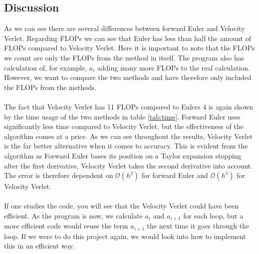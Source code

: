 \documentclass{article}
\begin{document}
\subsection{Discussion}
As we can see there are several differences between forward Euler and Velocity Verlet. Regarding FLOPs we can see that Euler has less than half the amount of FLOPs compared to Velocity Verlet. Here it is important to note that the FLOPs we count are only the FLOPs from the method in itself. The program also has calculation of, for example, $a_i$ adding many more FLOPs to the real calculation. However, we want to compare the two methods and have therefore only included the FLOPs from the methods. \\ \\ 
The fact that Velocity Verlet has 11 FLOPs compared to Eulers 4 is again shown by the time usage of the two methods in table \ref{tab:time}. Forward Euler uses significantly less time compared to Velocity Verlet, but the effectiveness of the algorithm comes at a price. As we can see throughout the results, Velocity Verlet is the far better alternative when it comes to accuracy. This is evident from the algorithm as Forward Euler bases its position on a Taylor expansion stopping after the first derivative, Velocity Verlet takes the second derivative into account. The error is therefore dependent on $\mathcal{O}(h^2)$ for forward Euler and $\mathcal{O}(h^3)$ for Velocity Verlet. \\ \\
If one studies the code, you will see that the Velocity Verlet could have been efficient. As the program is now, we calculate $a_i$ and $a_{i+1}$ for each loop, but a more efficient code would reuse the term $a_{i+1}$ the next time it goes through the loop. If we were to do this project again, we would look into how to implement this in an efficient way.
\end{document}
